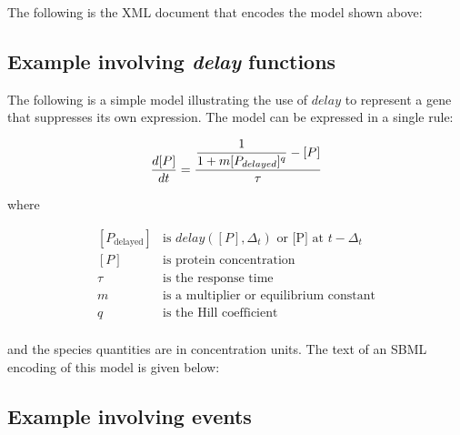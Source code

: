 The following is the XML document that encodes the model shown
above:



\subsection{Example involving \emph{delay} functions}
\label{sec:delayeg}

The following is a simple model illustrating the use of $delay$ to
represent a gene that suppresses its own expression.  The model
can be expressed in a single rule:
\begin{linenomath}
\begin{equation*}
  \frac{d [P]}{d t} = \dfrac{ \dfrac{1}{1 + m [P_{delayed}]^q} - [P] }{ \tau }\\
\end{equation*}
\end{linenomath}
where
\begin{linenomath}
  \begin{equation*}
    \begin{array}{rll}
      [P_\text{delayed}] & \text{is } delay([P], \Delta_t) \text{ or [P] at } t - \Delta_t\\[1pt]
      [P]           & \text{is protein concentration}\\[1pt]
      \tau          & \text{is the response time}\\[1pt]
      m             & \text{is a multiplier or equilibrium constant}\\[1pt]
      q             & \text{is the Hill coefficient}\\
    \end{array}
  \end{equation*}
\end{linenomath}
and the species quantities are in concentration units.
The text of an SBML encoding of this model is given below:



\subsection{Example involving events}
\label{sec:eventeg}

